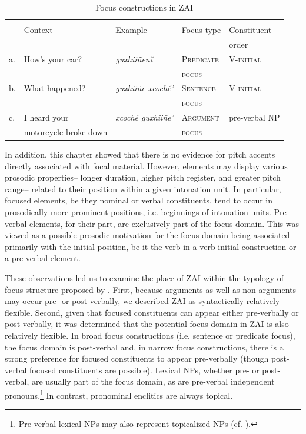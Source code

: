 \begin{table}[H] \caption{\small{Focus constructions in ZAI}}
\begin{tabular}{l l l  l l}
& & & & \\
 & Context & Example & Focus type & Constituent  \\
& & & & order \\
 \hline
a. &  How's your car? & \textit{guxhii\~{n}en\v{i}} & \textsc{Predicate} & \textsc{V-initial} \\
 &   &  & \textsc{focus} &  \\
b. & What happened? & \textit{guxhii\~{n}e xcoch\'{e}'} & \textsc{Sentence} & \textsc{V-initial} \\
 &  &  & \textsc{focus} & \\
c. & I heard your & \textit{xcoch\'{e} guxhii\~{n}e'} & \textsc{Argument} & pre-verbal NP \\
 & motorcycle broke down  &  & \textsc{focus} & \\
 \end{tabular}
\end{table}\label{allfocus}


In addition, this chapter showed that there is no evidence for pitch accents directly associated with focal material. However, elements may display various prosodic properties-- longer duration, higher pitch register, and greater pitch range-- related to their position within a given intonation unit. In particular, focused elements, be they nominal or verbal constituents, tend to occur in prosodically more prominent positions, i.e. beginnings of intonation units. Pre-verbal elements, for their part, are exclusively part of the focus domain. This was viewed as a possible prosodic motivation for the focus domain being associated primarily with the initial position, be it the verb in a verb-initial construction or a pre-verbal element.

These observations led us to examine the place of ZAI within the typology of focus structure proposed by \citet{vanvalin1999}. First, because arguments as well as non-arguments may occur pre- or post-verbally, we described ZAI as syntactically relatively flexible. Second, given that focused constituents can appear either pre-verbally or post-verbally, it was determined that the potential focus domain in ZAI is also relatively flexible. In broad focus constructions (i.e. sentence or predicate focus), the focus domain is post-verbal and, in narrow focus constructions, there is a strong preference for focused constituents to appear pre-verbally (though post-verbal focused constituents are possible). Lexical NPs, whether pre- or post-verbal, are usually part of the focus domain, as are pre-verbal independent pronouns.\footnote{Pre-verbal lexical NPs may also represent topicalized NPs (cf. ).} In contrast, pronominal enclitics are always topical. 


